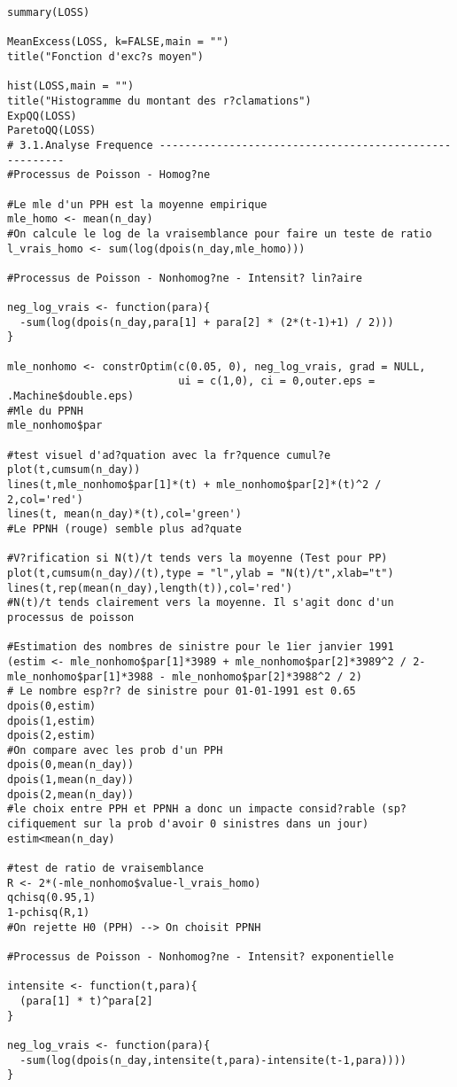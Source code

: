 \begin{verbatim}
summary(LOSS)

MeanExcess(LOSS, k=FALSE,main = "")
title("Fonction d'exc?s moyen")

hist(LOSS,main = "")
title("Histogramme du montant des r?clamations")
ExpQQ(LOSS)
ParetoQQ(LOSS)
# 3.1.Analyse Frequence -------------------------------------------------------
#Processus de Poisson - Homog?ne

#Le mle d'un PPH est la moyenne empirique
mle_homo <- mean(n_day)
#On calcule le log de la vraisemblance pour faire un teste de ratio
l_vrais_homo <- sum(log(dpois(n_day,mle_homo)))

#Processus de Poisson - Nonhomog?ne - Intensit? lin?aire

neg_log_vrais <- function(para){
  -sum(log(dpois(n_day,para[1] + para[2] * (2*(t-1)+1) / 2)))
}

mle_nonhomo <- constrOptim(c(0.05, 0), neg_log_vrais, grad = NULL, 
                           ui = c(1,0), ci = 0,outer.eps = .Machine$double.eps)
#Mle du PPNH
mle_nonhomo$par

#test visuel d'ad?quation avec la fr?quence cumul?e
plot(t,cumsum(n_day))
lines(t,mle_nonhomo$par[1]*(t) + mle_nonhomo$par[2]*(t)^2 / 2,col='red')
lines(t, mean(n_day)*(t),col='green')
#Le PPNH (rouge) semble plus ad?quate

#V?rification si N(t)/t tends vers la moyenne (Test pour PP)
plot(t,cumsum(n_day)/(t),type = "l",ylab = "N(t)/t",xlab="t")
lines(t,rep(mean(n_day),length(t)),col='red')
#N(t)/t tends clairement vers la moyenne. Il s'agit donc d'un processus de poisson

#Estimation des nombres de sinistre pour le 1ier janvier 1991
(estim <- mle_nonhomo$par[1]*3989 + mle_nonhomo$par[2]*3989^2 / 2-mle_nonhomo$par[1]*3988 - mle_nonhomo$par[2]*3988^2 / 2)
# Le nombre esp?r? de sinistre pour 01-01-1991 est 0.65
dpois(0,estim)
dpois(1,estim)
dpois(2,estim)
#On compare avec les prob d'un PPH
dpois(0,mean(n_day))
dpois(1,mean(n_day))
dpois(2,mean(n_day))
#le choix entre PPH et PPNH a donc un impacte consid?rable (sp?cifiquement sur la prob d'avoir 0 sinistres dans un jour)
estim<mean(n_day)

#test de ratio de vraisemblance
R <- 2*(-mle_nonhomo$value-l_vrais_homo)
qchisq(0.95,1)
1-pchisq(R,1)
#On rejette H0 (PPH) --> On choisit PPNH 

#Processus de Poisson - Nonhomog?ne - Intensit? exponentielle

intensite <- function(t,para){
  (para[1] * t)^para[2]
}

neg_log_vrais <- function(para){
  -sum(log(dpois(n_day,intensite(t,para)-intensite(t-1,para))))
}


\end{verbatim}
